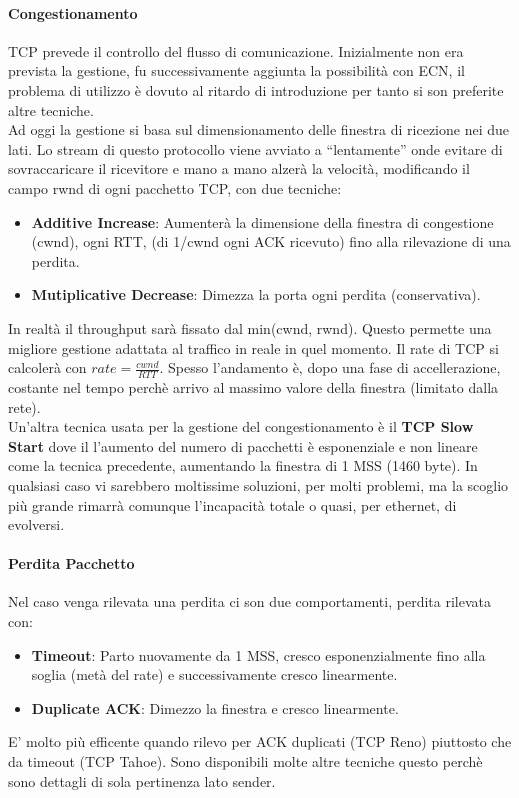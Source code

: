 \documentclass[12pt]{article}
\begin{document}
\paragraph{Congestionamento} TCP prevede il controllo del flusso di comunicazione. Inizialmente non era prevista la gestione, fu successivamente aggiunta la possibilità con ECN, il problema di utilizzo è dovuto al ritardo di introduzione per tanto si son preferite altre tecniche.\\
Ad oggi la gestione si basa sul dimensionamento delle finestra di ricezione nei due lati.
Lo stream di questo protocollo viene avviato a ``lentamente'' onde evitare di sovraccaricare il ricevitore e mano a mano alzerà la velocità, modificando il campo rwnd di ogni pacchetto TCP, con due tecniche:
\begin{itemize}
  \item \textbf{Additive Increase}: Aumenterà la dimensione della finestra di congestione (cwnd), ogni RTT, (di 1/cwnd ogni ACK ricevuto) fino alla rilevazione di una perdita.
  \item \textbf{Mutiplicative Decrease}: Dimezza la porta ogni perdita (conservativa).
\end{itemize}
In realtà il throughput sarà fissato dal min(cwnd, rwnd). Questo permette una migliore gestione adattata al traffico in reale in quel momento. Il rate di TCP si calcolerà con $rate=\frac{cwnd}{RTT}$. Spesso l'andamento è, dopo una fase di accellerazione, costante nel tempo perchè arrivo al massimo valore della finestra (limitato dalla rete). \\
Un'altra tecnica usata per la gestione del congestionamento è il \textbf{TCP Slow Start} dove il l'aumento del numero di pacchetti è esponenziale e non lineare come la tecnica precedente, aumentando la finestra di 1 MSS (1460 byte). In qualsiasi caso vi sarebbero moltissime soluzioni, per molti problemi, ma la scoglio più grande rimarrà comunque l'incapacità totale o quasi, per ethernet, di evolversi.

\paragraph{Perdita Pacchetto} Nel caso venga rilevata una perdita ci son due comportamenti, perdita rilevata con:
\begin{itemize}
  \item \textbf{Timeout}: Parto nuovamente da 1 MSS, cresco esponenzialmente fino alla soglia (metà del rate) e successivamente cresco linearmente.
  \item \textbf{Duplicate ACK}: Dimezzo la finestra e cresco linearmente.
\end{itemize}
E' molto più efficente quando rilevo per ACK duplicati (TCP Reno) piuttosto che da timeout (TCP Tahoe). Sono disponibili molte altre tecniche questo perchè sono dettagli di sola pertinenza lato sender.
\end{document}
